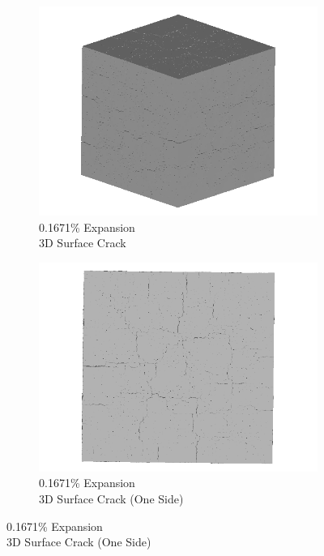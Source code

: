 \begin{figure}[ht!]
\centering
    \begin{subfigure}{.5\textwidth}
      \centering
      \includegraphics[width=0.5\linewidth]{Files/exp_3D/DEF/A30X-5C_1_3d.png}
      \caption{0.1671\% Expansion\\3D Surface Crack}
    \end{subfigure}%
    \begin{subfigure}{.5\textwidth}
      \centering
      \includegraphics[width=0.5\linewidth]{Files/exp_3D/DEF/A30X-5C_1_3ds.png}
      \caption{0.1671\% Expansion\\3D Surface Crack (One Side)}
    \end{subfigure}%


\end{figure}
